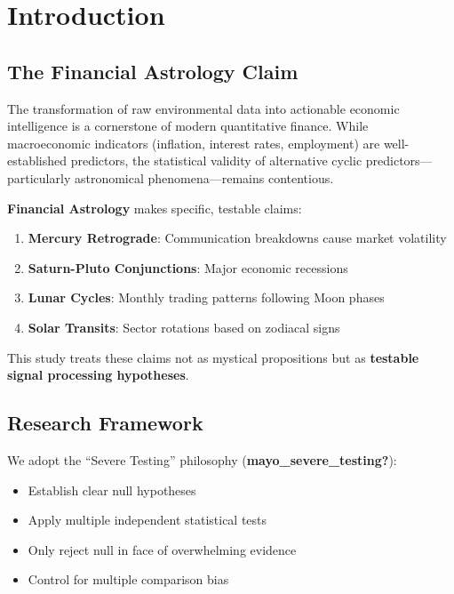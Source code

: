 \documentclass[
  11pt,
  a4paper,
  oneside,
  openany]{article}
\providecommand{\tightlist}{%
  \setlength{\itemsep}{0pt}\setlength{\parskip}{0pt}}\usepackage{longtable,booktabs,array}
\begin{document}
\section{Introduction}\label{introduction}

\subsection{The Financial Astrology
Claim}\label{the-financial-astrology-claim}

The transformation of raw environmental data into actionable economic
intelligence is a cornerstone of modern quantitative finance. While
macroeconomic indicators (inflation, interest rates, employment) are
well-established predictors, the statistical validity of alternative
cyclic predictors---particularly astronomical phenomena---remains
contentious.

\textbf{Financial Astrology} makes specific, testable claims:

\begin{enumerate}
\def\labelenumi{\arabic{enumi}.}
\tightlist
\item
  \textbf{Mercury Retrograde}: Communication breakdowns cause market
  volatility
\item
  \textbf{Saturn-Pluto Conjunctions}: Major economic recessions
\item
  \textbf{Lunar Cycles}: Monthly trading patterns following Moon phases
\item
  \textbf{Solar Transits}: Sector rotations based on zodiacal signs
\end{enumerate}

This study treats these claims not as mystical propositions but as
\textbf{testable signal processing hypotheses}.

\subsection{Research Framework}\label{research-framework}

We adopt the ``Severe Testing'' philosophy
(\textbf{mayo\_severe\_testing?}):

\begin{itemize}
\tightlist
\item
  Establish clear null hypotheses
\item
  Apply multiple independent statistical tests
\item
  Only reject null in face of overwhelming evidence
\item
  Control for multiple comparison bias
\end{itemize}
\end{document}
